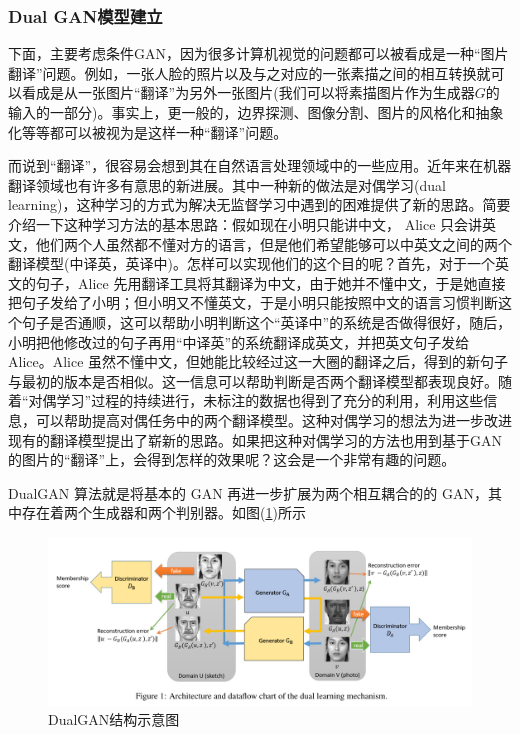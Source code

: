         \subsubsection{Dual GAN模型建立}
            \par
            下面，主要考虑条件GAN，因为很多计算机视觉的问题都可以被看成是一种“图片翻译”问题。例如，一张人脸的照片以及与之对应的一张素描之间的相互转换就可以看成是从一张图片“翻译”为另外一张图片(我们可以将素描图片作为生成器$G$的输入的一部分)。事实上，更一般的，边界探测、图像分割、图片的风格化和抽象化等等都可以被视为是这样一种“翻译”问题。
            \par
            而说到“翻译”，很容易会想到其在自然语言处理领域中的一些应用。近年来在机器翻译领域也有许多有意思的新进展。其中一种新的做法是对偶学习(dual learning)，这种学习的方式为解决无监督学习中遇到的困难提供了新的思路。简要介绍一下这种学习方法的基本思路：假如现在小明只能讲中文， Alice 只会讲英文，他们两个人虽然都不懂对方的语言，但是他们希望能够可以中英文之间的两个翻译模型(中译英，英译中)。怎样可以实现他们的这个目的呢？首先，对于一个英文的句子，Alice 先用翻译工具将其翻译为中文，由于她并不懂中文，于是她直接把句子发给了小明；但小明又不懂英文，于是小明只能按照中文的语言习惯判断这个句子是否通顺，这可以帮助小明判断这个“英译中”的系统是否做得很好，随后，小明把他修改过的句子再用“中译英”的系统翻译成英文，并把英文句子发给 Alice。Alice 虽然不懂中文，但她能比较经过这一大圈的翻译之后，得到的新句子与最初的版本是否相似。这一信息可以帮助判断是否两个翻译模型都表现良好。随着“对偶学习”过程的持续进行，未标注的数据也得到了充分的利用，利用这些信息，可以帮助提高对偶任务中的两个翻译模型。这种对偶学习的想法为进一步改进现有的翻译模型提出了崭新的思路。如果把这种对偶学习的方法也用到基于GAN的图片的“翻译”上，会得到怎样的效果呢？这会是一个非常有趣的问题。
            \par
            DualGAN 算法就是将基本的 GAN 再进一步扩展为两个相互耦合的的 GAN，其中存在着两个生成器和两个判别器。如图(\ref{fig:DualGAN结构示意图})所示
                \begin{figure}[H]
                \centering
                \includegraphics[width=14cm]{images/DualGAN_structure.jpg}
                \caption{DualGAN结构示意图}
                \label{fig:DualGAN结构示意图}
                \end{figure}
